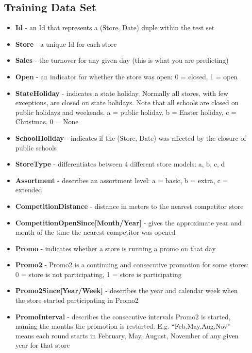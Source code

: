 \documentclass[DIV=calc, paper=a4, fontsize=11pt]{scrartcl}	 %
\begin{document}
\subsection*{Training Data Set}
\begin{itemize}
\item \textbf{Id} - an Id that represents a (Store, Date) duple within the test set
\item \textbf{Store} - a unique Id for each store
\item \textbf{Sales} - the turnover for any given day (this is what you are predicting)
\item \textbf{Open} - an indicator for whether the store was open: 0 = closed, 1 = open
\item \textbf{StateHoliday} - indicates a state holiday. Normally all stores, with few exceptions, are closed on state holidays. Note that all schools are closed on public holidays and weekends. a = public holiday, b = Easter holiday, c = Christmas, 0 = None
\item \textbf{SchoolHoliday} - indicates if the (Store, Date) was affected by the closure of public schools
\item \textbf{StoreType} - differentiates between 4 different store models: a, b, c, d
\item \textbf{Assortment} - describes an assortment level: a = basic, b = extra, c = extended
\item \textbf{CompetitionDistance} - distance in meters to the nearest competitor store
\item \textbf{CompetitionOpenSince[Month/Year]} - gives the approximate year and month of the time the nearest competitor was opened
\item \textbf{Promo} - indicates whether a store is running a promo on that day
\item \textbf{Promo2} - Promo2 is a continuing and consecutive promotion for some stores: 0 = store is not participating, 1 = store is participating
\item \textbf{Promo2Since[Year/Week]} - describes the year and calendar week when the store started participating in Promo2
\item \textbf{PromoInterval} - describes the consecutive intervals Promo2 is started, naming the months the promotion is restarted. E.g. ``Feb,May,Aug,Nov'' means each round starts in February, May, August, November of any given year for that store\cite{RossmannKaggle}

\end{itemize}
\end{document}
